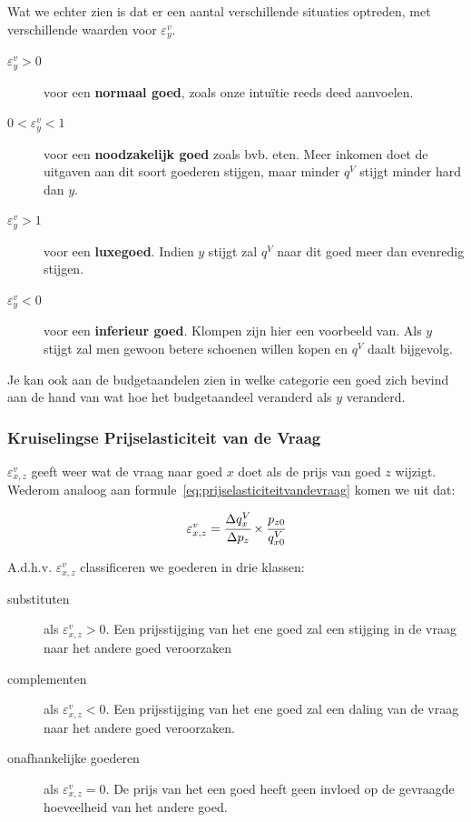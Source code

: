 Wat we echter zien is dat er een aantal verschillende situaties optreden, met verschillende waarden voor $\varepsilon^{v}_{y}$.
\begin{description}
	\item[$\varepsilon^{v}_{y} > 0$] voor een \textbf{normaal goed}, zoals onze intu\"itie reeds deed aanvoelen.
    \item[$0 < \varepsilon^{v}_{y} < 1$] voor een \textbf{noodzakelijk goed} zoals bvb. eten. Meer inkomen doet de uitgaven aan dit soort goederen stijgen, maar minder $q^V$ stijgt minder hard dan $y$.
    \item[$\varepsilon^{v}_{y} > 1$] voor een \textbf{luxegoed}. Indien $y$ stijgt zal $q^V$ naar dit goed meer dan evenredig stijgen.
    \item[$\varepsilon^{v}_{y} < 0$] voor een \textbf{inferieur goed}. Klompen zijn hier een voorbeeld van. Als $y$ stijgt zal men gewoon betere schoenen willen kopen en $q^V$ daalt bijgevolg.
\end{description}

Je kan ook aan de budgetaandelen zien in welke categorie een goed zich bevind aan de hand van wat hoe het budgetaandeel veranderd als $y$ veranderd.

\subsubsection{Kruiselingse Prijselasticiteit van de Vraag}
$\varepsilon^{v}_{x,z}$ geeft weer wat de vraag naar goed $x$ doet als de prijs van goed $z$ wijzigt. Wederom analoog aan formule~\ref{eq:prijselasticiteitvandevraag} komen we uit dat:

\begin{equation}
	\varepsilon^{v}_{x,z} =
    \cfrac{\Delta q^{V}_{x}}{\Delta p_z} \times \cfrac{p_{z0}}{q_{x0}^{V}}
\end{equation}

A.d.h.v. $\varepsilon^{v}_{x,z}$ classificeren we goederen in drie klassen:
\begin{description}
	\item[substituten] als $\varepsilon^{v}_{x,z} > 0$. Een prijsstijging van het ene goed zal een stijging in de vraag naar het andere goed veroorzaken
    \item[complementen] als $\varepsilon^{v}_{x,z} < 0$. Een prijsstijging van het ene goed zal een daling van de vraag naar het andere goed veroorzaken.
    \item[onafhankelijke goederen] als $\varepsilon^{v}_{x,z} = 0$. De prijs van het een goed heeft geen invloed op de gevraagde hoeveelheid van het andere goed.
\end{description}

